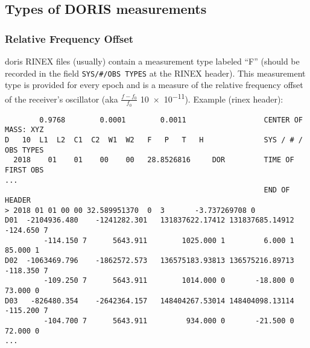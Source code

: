 \subsection{Types of DORIS measurements}\label{ssec:types-of-doris-measurements}

\subsubsection{Relative Frequency Offset}\label{sssec:relative-frequency-offset}
\gls{doris} RINEX files (usually) contain a measurement type labeled ``F'' (should be 
recorded in the field \verb|SYS/#/OBS TYPES| at the RINEX header). This measurement 
type is provided for every epoch and is a measure of the relative frequency 
offset of the receiver's oscillator (aka \(\frac{f-f_0}{f_0}\) \num{10e-11}).
Example (rinex header):

\begin{adjustbox}{max width=\linewidth , fbox=0.5pt}
\begin{BVerbatim}
        0.9768        0.0001        0.0011                  CENTER OF MASS: XYZ
D   10  L1  L2  C1  C2  W1  W2   F   P   T   H              SYS / # / OBS TYPES
  2018    01    01    00    00   28.8526816     DOR         TIME OF FIRST OBS
...
                                                            END OF HEADER
> 2018 01 01 00 00 32.589951370  0  3       -3.737269708 0
D01  -2104936.480    -1241282.301   131837622.17412 131837685.14912      -124.650 7
         -114.150 7      5643.911        1025.000 1         6.000 1        85.000 1
D02  -1063469.796    -1862572.573   136575183.93813 136575216.89713      -118.350 7
         -109.250 7      5643.911        1014.000 0       -18.800 0        73.000 0
D03   -826480.354    -2642364.157   148404267.53014 148404098.13114      -115.200 7
         -104.700 7      5643.911         934.000 0       -21.500 0        72.000 0
...                                                            
\end{BVerbatim}
\end{adjustbox}
\fi
